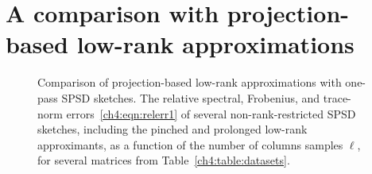 \section{A comparison with projection-based low-rank approximations}
\label{ch4:sec:comparison}

\begin{figure}[tb!]
 \centering
 
 
 
 \caption[Comparison of projection-based low-rank approximations with one-pass SPSD sketches]{%
 {\sc Comparison of projection-based low-rank approximations with one-pass SPSD sketches.}
 The relative spectral, Frobenius, and trace-norm errors~\eqref{ch4:eqn:relerr1} of several
 non-rank-restricted SPSD sketches, including the pinched and prolonged low-rank approximants, 
 as a function of the number of columns samples $\ell$, 
 for several matrices from Table~\ref{ch4:table:datasets}. }%
 \label{fig:pinched-and-prolonged-approximants}
\end{figure}

